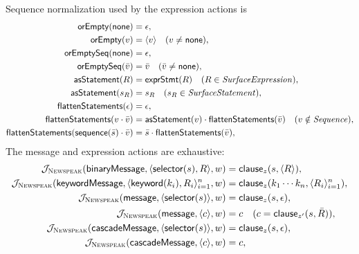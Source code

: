 Sequence normalization used by the expression actions is
\begin{equation}\label{eq:newspeak-action-sequence-helpers}
\begin{aligned}
 \mathsf{orEmpty}(\mathsf{none})&=\epsilon,\\
 \mathsf{orEmpty}(v)&=\langle v\rangle\quad(v\ne\mathsf{none}),\\
 \mathsf{orEmptySeq}(\mathsf{none})&=\epsilon,\\
 \mathsf{orEmptySeq}(\bar v)&=\bar v\quad(\bar v\ne\mathsf{none}),\\
 \mathsf{asStatement}(R)&=\mathsf{exprStmt}(R)
      \quad(R\in\mathit{SurfaceExpression}),\\
 \mathsf{asStatement}(s_R)&=s_R
      \quad(s_R\in\mathit{SurfaceStatement}),\\
 \mathsf{flattenStatements}(\epsilon)&=\epsilon,\\
 \mathsf{flattenStatements}(v\cdot\bar v)&=
      \mathsf{asStatement}(v)\cdot\mathsf{flattenStatements}(\bar v)
      \quad(v\notin\mathit{Sequence}),\\
 \mathsf{flattenStatements}(\mathsf{sequence}(\bar s)\cdot\bar v)&=
      \bar s\cdot\mathsf{flattenStatements}(\bar v),\\
\end{aligned}
\end{equation}
The message and expression actions are exhaustive:
\begin{equation}\label{eq:newspeak-expression-actions}
\begin{aligned}
 \mathcal J_{\textsc{Newspeak}}(\mathsf{binaryMessage},
      \langle\mathsf{selector}(s),R\rangle,w)
   &=\mathsf{clause}_{z}(s,\langle R\rangle),\\
 \mathcal J_{\textsc{Newspeak}}(\mathsf{keywordMessage},
      \langle\mathsf{keyword}(k_i),R_i\rangle_{i=1}^{n},w)
   &=\mathsf{clause}_{z}(k_1\cdots k_n,\langle R_i\rangle_{i=1}^{n}),\\
 \mathcal J_{\textsc{Newspeak}}(\mathsf{message},
      \langle\mathsf{selector}(s)\rangle,w)&=\mathsf{clause}_{z}(s,\epsilon),\\
 \mathcal J_{\textsc{Newspeak}}(\mathsf{message},\langle c\rangle,w)&=c
      \quad(c=\mathsf{clause}_{z'}(s,\bar R)),\\
 \mathcal J_{\textsc{Newspeak}}(\mathsf{cascadeMessage},
      \langle\mathsf{selector}(s)\rangle,w)&=\mathsf{clause}_{z}(s,\epsilon),\\
 \mathcal J_{\textsc{Newspeak}}(\mathsf{cascadeMessage},\langle c\rangle,w)&=c,\\
\end{aligned}
\end{equation}
